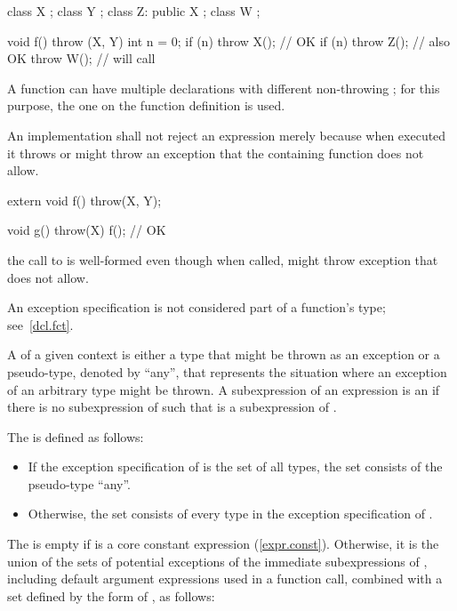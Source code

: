 \enterexample
\begin{codeblock}
class X { };
class Y { };
class Z: public X { };
class W { };

void f() throw (X, Y) {
  int n = 0;
  if (n) throw X();             // OK
  if (n) throw Z();             // also OK
  throw W();                    // will call 
}
\end{codeblock}
\exitexample

\enternote A function can have multiple declarations with different non-throwing
; for this purpose, the one on the
function definition is used. \exitnote

\pnum
An implementation shall not reject an expression merely because when
executed it throws or might
throw an exception that the containing function does not allow.
\enterexample
\begin{codeblock}
extern void f() throw(X, Y);

void g() throw(X) {
  f();                          // OK
}

\end{codeblock}
the call to
is well-formed even though when called,
might throw exception
that
does not allow.
\exitexample

\pnum
\enternote
An
exception specification
is not considered part of a function's type;
see~\ref{dcl.fct}.
\exitnote

\pnum
A  of a given context is either a type that might be
thrown as an exception or a pseudo-type, denoted by ``any'', that
represents the situation where an exception of an arbitrary type might
be thrown. A subexpression  of an expression  is an
 if there is no subexpression  of 
such that  is a subexpression of .

\pnum
The   is defined as follows:
\begin{itemize}
\item
If the exception specification of  is the set of all types,
the set consists of the pseudo-type ``any''.
\item
Otherwise, the set consists of
every type in the exception specification of .
\end{itemize}

\pnum
The   is empty
if  is a core constant expression (\ref{expr.const}).
Otherwise, it is the union of the sets of potential exceptions of
the immediate subexpressions of ,
including default argument expressions used in a function call,
combined with a set  defined by the form of , as follows:

